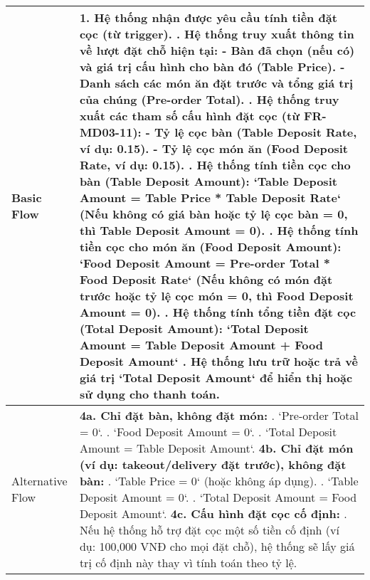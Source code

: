 \begin{longtable}{|m{4cm}|p{11cm}|}
Basic Flow & 1. Hệ thống nhận được yêu cầu tính tiền đặt cọc (từ trigger). \newline 2. Hệ thống truy xuất thông tin về lượt đặt chỗ hiện tại: \newline    - Bàn đã chọn (nếu có) và giá trị cấu hình cho bàn đó (Table Price). \newline    - Danh sách các món ăn đặt trước và tổng giá trị của chúng (Pre-order Total). \newline 3. Hệ thống truy xuất các tham số cấu hình đặt cọc (từ FR-MD03-11): \newline    - Tỷ lệ cọc bàn (Table Deposit Rate, ví dụ: 0.15). \newline    - Tỷ lệ cọc món ăn (Food Deposit Rate, ví dụ: 0.15). \newline 4. Hệ thống tính tiền cọc cho bàn (Table Deposit Amount): \newline    `Table Deposit Amount = Table Price * Table Deposit Rate` \newline    (Nếu không có giá bàn hoặc tỷ lệ cọc bàn = 0, thì Table Deposit Amount = 0). \newline 5. Hệ thống tính tiền cọc cho món ăn (Food Deposit Amount): \newline    `Food Deposit Amount = Pre-order Total * Food Deposit Rate` \newline    (Nếu không có món đặt trước hoặc tỷ lệ cọc món = 0, thì Food Deposit Amount = 0). \newline 6. Hệ thống tính tổng tiền đặt cọc (Total Deposit Amount): \newline    `Total Deposit Amount = Table Deposit Amount + Food Deposit Amount` \newline 7. Hệ thống lưu trữ hoặc trả về giá trị `Total Deposit Amount` để hiển thị hoặc sử dụng cho thanh toán. \\
\hline
Alternative Flow & \textbf{4a. Chỉ đặt bàn, không đặt món:} \newline    1. `Pre-order Total = 0`. \newline    2. `Food Deposit Amount = 0`. \newline    3. `Total Deposit Amount = Table Deposit Amount`. \newline \textbf{4b. Chỉ đặt món (ví dụ: takeout/delivery đặt trước), không đặt bàn:} \newline    1. `Table Price = 0` (hoặc không áp dụng). \newline    2. `Table Deposit Amount = 0`. \newline    3. `Total Deposit Amount = Food Deposit Amount`. \newline \textbf{4c. Cấu hình đặt cọc cố định:} \newline    1. Nếu hệ thống hỗ trợ đặt cọc một số tiền cố định (ví dụ: 100,000 VNĐ cho mọi đặt chỗ), hệ thống sẽ lấy giá trị cố định này thay vì tính toán theo tỷ lệ. \\

\end{longtable}
